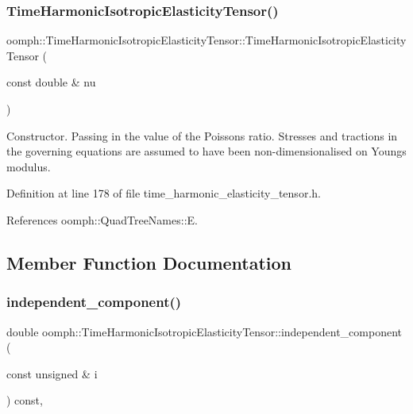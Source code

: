 \subsubsection{\texorpdfstring{Time\+Harmonic\+Isotropic\+Elasticity\+Tensor()}{TimeHarmonicIsotropicElasticityTensor()}\hspace{0.1cm}{\footnotesize\ttfamily [2/2]}}
{\footnotesize\ttfamily oomph\+::\+Time\+Harmonic\+Isotropic\+Elasticity\+Tensor\+::\+Time\+Harmonic\+Isotropic\+Elasticity\+Tensor (\begin{DoxyParamCaption}\item[{const double \&}]{nu }\end{DoxyParamCaption})\hspace{0.3cm}{\ttfamily [inline]}}



Constructor. Passing in the value of the Poisson\textquotesingle{}s ratio. Stresses and tractions in the governing equations are assumed to have been non-\/dimensionalised on Young\textquotesingle{}s modulus. 



Definition at line 178 of file time\+\_\+harmonic\+\_\+elasticity\+\_\+tensor.\+h.



References oomph\+::\+Quad\+Tree\+Names\+::E.



\subsection{Member Function Documentation}
\mbox{\label{classoomph_1_1TimeHarmonicIsotropicElasticityTensor_a23e7e1a4c9ad0563378e613adce3c635}} 
\subsubsection{\texorpdfstring{independent\+\_\+component()}{independent\_component()}}
{\footnotesize\ttfamily double oomph\+::\+Time\+Harmonic\+Isotropic\+Elasticity\+Tensor\+::independent\+\_\+component (\begin{DoxyParamCaption}\item[{const unsigned \&}]{i }\end{DoxyParamCaption}) const\hspace{0.3cm}{\ttfamily [inline]}, {\ttfamily [virtual]}}



